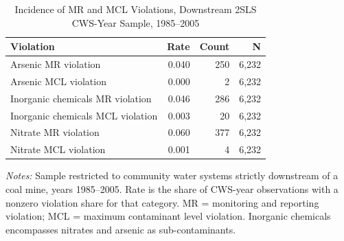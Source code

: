 
\begin{table}[htbp]
\centering
\caption{Incidence of MR and MCL Violations, Downstream 2SLS CWS-Year Sample, 1985--2005}
\label{tab:mr_mcl_incidence_summary}
\small
\begin{tabular}{lrrr}
\hline\hline
\textbf{Violation} & \textbf{Rate} & \textbf{Count} & \textbf{N} \\
\hline
Arsenic MR violation & 0.040 & 250 & 6,232 \\
Arsenic MCL violation & 0.000 & 2 & 6,232 \\
Inorganic chemicals MR violation & 0.046 & 286 & 6,232 \\
Inorganic chemicals MCL violation & 0.003 & 20 & 6,232 \\
Nitrate MR violation & 0.060 & 377 & 6,232 \\
Nitrate MCL violation & 0.001 & 4 & 6,232 \\
\hline\hline
\end{tabular}
\begin{minipage}{\linewidth}
\vspace{4pt}
\footnotesize
\textit{Notes:} Sample restricted to community water systems strictly downstream of a coal mine, years 1985--2005. Rate is the share of CWS-year observations with a nonzero violation share for that category. MR = monitoring and reporting violation; MCL = maximum contaminant level violation. Inorganic chemicals encompasses nitrates and arsenic as sub-contaminants.
\end{minipage}
\end{table}
